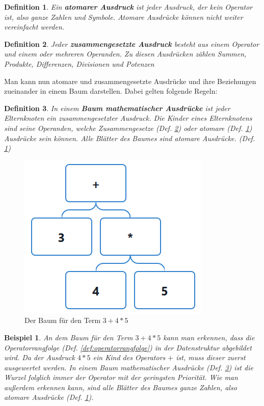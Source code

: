 \documentclass[11pt]{article}
\newtheorem{defin}{Definition}
\newcommand{\lab}[1]{(Def. \ref{#1})}
\newtheorem{example}{Beispiel}
\begin{document}
\begin{defin}
Ein \textbf{atomarer Ausdruck} ist jeder Ausdruck, der kein Operator ist, also ganze Zahlen und Symbole. 
Atomare Ausdrücke können nicht weiter vereinfacht werden.
\label{def:atomarer_ausdruck}
\end{defin}

\begin{defin}
Jeder \textbf{zusammengesetzte Ausdruck} besteht aus einem Operator und einem oder mehreren Operanden. 
Zu diesen Ausdrücken zählen Summen, Produkte, Differenzen, Divisionen und Potenzen
\label{def:zusammengesetzter_ausdruck}
\end{defin}

Man kann nun atomare und zusammengesetzte Ausdrücke und ihre Beziehungen zueinander in einem Baum darstellen.
Dabei gelten folgende Regeln:

\begin{defin}
In einem \textbf{Baum mathematischer Ausdrücke} ist jeder Elternknoten ein zusammengesetzter Ausdruck. Die Kinder
eines Elternknotens sind seine Operanden, welche Zusammengesetze \lab{def:zusammengesetzter_ausdruck} oder atomare 
\lab{def:atomarer_ausdruck} Ausdrücke sein können. Alle Blätter des Baumes sind atomare Ausdrücke. \lab{def:atomarer_ausdruck}
\label{def:baum}
\end{defin}

\begin{figure}[h]
  \centering
  \includegraphics[scale=0.5]{trees/beispiel_1_baum.png}
  \caption{Der Baum für den Term $3+4*5$}
\end{figure}

\begin{example}
   An dem Baum für den Term $3+4*5$ kann man erkennen, dass die Operatorrangfolge \lab{def:operatorrangfolge}
   in der Datenstruktur abgebildet wird. Da der Ausdruck $4*5$ ein Kind des Operators $+$ ist, muss dieser zuerst 
   ausgewertet werden. In einem Baum mathematischer Ausdrücke \lab{def:baum} ist die Wurzel folglich immer
   der Operator mit der geringsten Priorität.
   Wie man außerdem erkennen kann, sind alle Blätter des Baumes ganze Zahlen, also atomare Ausdrücke \lab{def:atomarer_ausdruck}.
\end{example}
\end{document}
